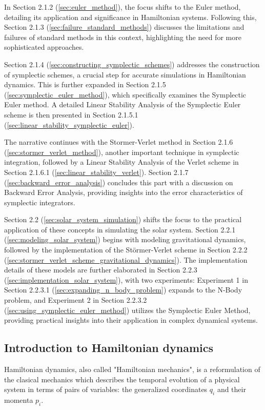 \documentclass{article}
\begin{document}
In Section 2.1.2 (\ref{sec:euler_method}), the focus shifts to the Euler method, detailing its application and significance in Hamiltonian systems. Following this, Section 2.1.3 (\ref{sec:failure_standard_methods}) discusses the limitations and failures of standard methods in this context, highlighting the need for more sophisticated approaches.

Section 2.1.4 (\ref{sec:constructing_symplectic_schemes}) addresses the construction of symplectic schemes, a crucial step for accurate simulations in Hamiltonian dynamics. This is further expanded in Section 2.1.5 (\ref{sec:symplectic_euler_method}), which specifically examines the Symplectic Euler method. A detailed Linear Stability Analysis of the Symplectic Euler scheme is then presented in Section 2.1.5.1 (\ref{sec:linear_stability_symplectic_euler}).

The narrative continues with the Stormer-Verlet method in Section 2.1.6 (\ref{sec:stormer_verlet_method}), another important technique in symplectic integration, followed by a Linear Stability Analysis of the Verlet scheme in Section 2.1.6.1 (\ref{sec:linear_stability_verlet}). Section 2.1.7 (\ref{sec:backward_error_analysis}) concludes this part with a discussion on Backward Error Analysis, providing insights into the error characteristics of symplectic integrators.

Section 2.2 (\ref{sec:solar_system_simulation}) shifts the focus to the practical application of these concepts in simulating the solar system. Section 2.2.1 (\ref{sec:modeling_solar_system}) begins with modeling gravitational dynamics, followed by the implementation of the Störmer-Verlet scheme in Section 2.2.2 (\ref{sec:stormer_verlet_scheme_gravitational_dynamics}). The implementation details of these models are further elaborated in Section 2.2.3 (\ref{sec:implementation_solar_system}), with two experiments: Experiment 1 in Section 2.2.3.1 (\ref{sec:expanding_n_body_problem}) expands to the N-Body problem, and Experiment 2 in Section 2.2.3.2 (\ref{sec:using_symplectic_euler_method}) utilizes the Symplectic Euler Method, providing practical insights into their application in complex dynamical systems.

\subsection{Introduction to Hamiltonian dynamics}
\label{sec:introduction_hamiltonian_dynamics}

Hamiltonian dynamics, also called "Hamiltonian mechanics", is a reformulation of the clasical mechanics which describes the temporal evolution of a physical system in terms of pairs of variables: the generalized coordinates \(q_i\) and their momenta \(p_i\).
\end{document}
